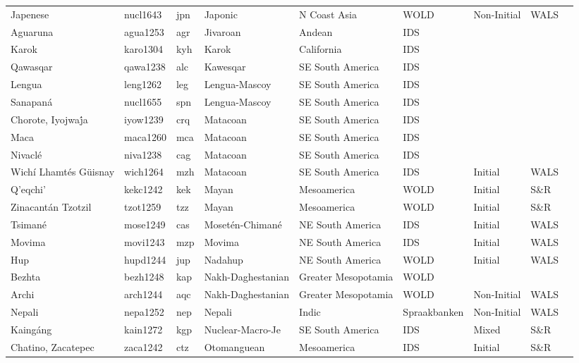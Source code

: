 \begin{longtable}{lllllllll}
  Japenese & nucl1643 & jpn & Japonic & N Coast Asia & WOLD & Non-Initial & WALS &  \\ 
  Aguaruna & agua1253 & agr & Jivaroan & Andean & IDS &  &  &  \\ 
  Karok & karo1304 & kyh & Karok & California & IDS &  &  &  \\ 
  Qawasqar & qawa1238 & alc & Kawesqar & SE South America & IDS &  &  &  \\ 
  Lengua & leng1262 & leg & Lengua-Mascoy & SE South America & IDS &  &  &  \\ 
  Sanapaná & nucl1655 & spn & Lengua-Mascoy & SE South America & IDS &  &  &  \\ 
  Chorote, Iyojwa\'ja & iyow1239 & crq & Matacoan & SE South America & IDS &  &  &  \\ 
  Maca & maca1260 & mca & Matacoan & SE South America & IDS &  &  &  \\ 
  Nivaclé & niva1238 & cag & Matacoan & SE South America & IDS &  &  &  \\ 
  Wichí Lhamtés Güisnay & wich1264 & mzh & Matacoan & SE South America & IDS & Initial & WALS &  \\ 
  Q'eqchi' & kekc1242 & kek & Mayan & Mesoamerica & WOLD & Initial & S\&R & \cite[84,96]{stewart_kekchi1980v2.pdf} \\ 
  Zinacantán Tzotzil & tzot1259 & tzz & Mayan & Mesoamerica & WOLD & Initial & S\&R & \cite[6..]{cowan_tzotzil2014.pdf} \\ 
  Tsimané & mose1249 & cas & Mosetén-Chimané & NE South America & IDS & Initial & WALS &  \\ 
  Movima & movi1243 & mzp & Movima & NE South America & IDS & Initial & WALS &  \\ 
  Hup & hupd1244 & jup & Nadahup & NE South America & WOLD & Initial & WALS &  \\ 
  Bezhta & bezh1248 & kap & Nakh-Daghestanian & Greater Mesopotamia & WOLD &  &  &  \\ 
  Archi & arch1244 & aqc & Nakh-Daghestanian & Greater Mesopotamia & WOLD & Non-Initial & WALS &  \\ 
  Nepali & nepa1252 & nep & Nepali & Indic & Spraakbanken & Non-Initial & WALS &  \\ 
  Kaingáng & kain1272 & kgp & Nuclear-Macro-Je & SE South America & IDS & Mixed & S\&R & \cite[163-171]{dasilva_kaingang-paulista2011}\cite[156]{wieseman_kaingang1972.pdf} \\ 
  Chatino, Zacatepec & zaca1242 & ctz & Otomanguean & Mesoamerica & IDS & Initial & S\&R & \cite[92]{villard_zacatepec-chatino2009} \\ 

\end{longtable}
